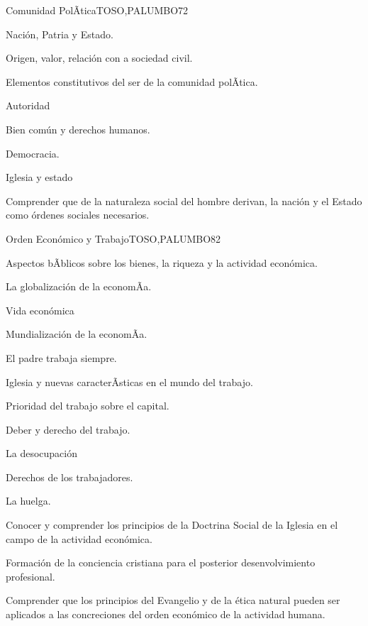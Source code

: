 \begin{syllabus}
\begin{unit}{Comunidad PolÃ­tica}{TOSO,PALUMBO}{7}{2}
\begin{topics}
	\item Nación, Patria y Estado.
	\item Origen, valor, relación con a sociedad civil.
	\item Elementos constitutivos del ser de la comunidad polÃ­tica.
	\item Autoridad
	\item Bien común y derechos humanos.
	\item Democracia.
	\item Iglesia y estado
\end{topics}
\begin{unitgoals}
	\item Comprender que de la naturaleza social del hombre derivan, la nación y el Estado como órdenes sociales necesarios.
\end{unitgoals}
\end{unit}

\begin{unit}{Orden Económico y Trabajo}{TOSO,PALUMBO}{8}{2}
\begin{topics}
	\item Aspectos bÃ­blicos sobre los bienes, la riqueza y la actividad económica.
	\item La globalización de la economÃ­a.
	\item Vida económica
	\item Mundialización de la economÃ­a.
	\item El padre trabaja siempre.
	\item Iglesia y nuevas caracterÃ­sticas en el mundo del trabajo.
	\item Prioridad del trabajo sobre el capital.
	\item Deber y derecho del trabajo.
	\item La desocupación
	\item Derechos de los trabajadores.
	\item La huelga.
\end{topics}
\begin{unitgoals}
	\item Conocer y comprender los principios de la Doctrina Social de la Iglesia en el campo de la actividad económica.
	\item Formación de la conciencia cristiana para el posterior desenvolvimiento profesional.
	\item Comprender que los principios del Evangelio y de la ética natural pueden ser aplicados a las concreciones del orden económico de la actividad humana.
\end{unitgoals}
\end{unit}



\begin{coursebibliography}
\end{coursebibliography}

\end{syllabus}
